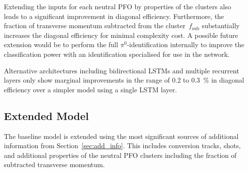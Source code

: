 Extending the inputs for each neutral PFO by properties of the clusters also
leads to a significant improvement in diagonal efficiency. Furthermore, the
fraction of transverse momentum subtracted from the cluster~$f_\text{sub}$
substantially increases the diagonal efficiency for minimal complexity cost. A
possible future extension would be to perform the full $\pi^0$-identification
internally to improve the classification power with an identification
specialised for use in the network.

Alternative architectures including bidirectional LSTMs and multiple recurrent
layers only show marginal improvements in the range of \num{0.2} to
\SI{0.3}{\percent} in diagonal efficiency over a simpler model using a single
LSTM layer.

\subsection{Extended Model}
\label{sec:extended_model}

The baseline model is extended using the most significant sources of additional
information from Section~\ref{sec:add_info}. This includes conversion tracks,
shots, and additional properties of the neutral PFO clusters including the
fraction of subtracted transverse momentum.



